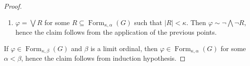 \documentclass{article}
\theoremstyle{definition}
\DeclareMathOperator{\Ch}{Ch}
\DeclareMathOperator{\Formulas}{Form}
\begin{document}
\begin{proof}
\begin{enumerate}
    \item $\varphi = \bigvee R$ for some $R \subseteq \Formulas_{\kappa,\alpha}(G)$ such that $|R|<\kappa$. Then $\varphi \sim \neg \bigwedge \neg R$, hence the claim follows from the application of the previous points.
\end{enumerate}

If $\varphi \in \Formulas_{\kappa,\beta}(G)$ and $\beta$ is a limit ordinal, then $\varphi \in \Formulas_{\kappa,\alpha}(G)$ for some $\alpha < \beta$, hence the claim follows from induction hypothesis.
\end{proof}
\end{document}
